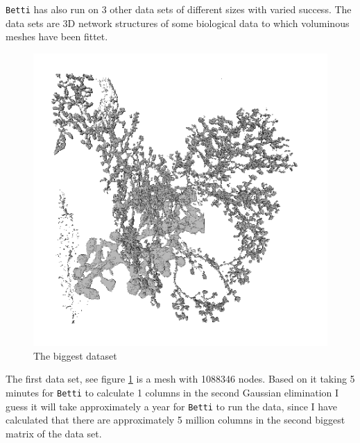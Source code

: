 \documentclass[11pt,a4paper,twoside]{report}
\begin{document}
\texttt{Betti} has also run on 3 other data sets of different sizes with varied success. 
The data sets are 3D network structures of some biological data to which voluminous meshes have been fittet.
\begin{figure}[H]
\center
\includegraphics[scale=0.5]{downsampled00.png}
\caption{The biggest dataset}
\label{fig:mesh_down}
\end{figure}
The first data set, see figure \ref{fig:mesh_down} is a mesh with 1088346 nodes. Based on it taking 5 minutes for \texttt{Betti} to calculate 1 columns in the second Gaussian elimination I guess it will take approximately a year for \texttt{Betti} to run the data, since I have calculated that there are approximately 5 million columns in the second biggest matrix of the data set. 
\end{document}
